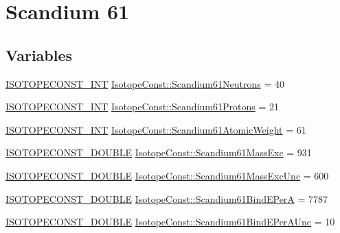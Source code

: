 \hypertarget{group___isotope_const-_scandium-_sc61}{}\section{Scandium 61}
\label{group___isotope_const-_scandium-_sc61}
\subsection*{Variables}
\begin{DoxyCompactItemize}
\item 
\mbox{\hyperlink{group___isotope_const-_macros_ga5f18360b3e99483a35c32d789e62621c}{I\+S\+O\+T\+O\+P\+E\+C\+O\+N\+S\+T\+\_\+\+I\+NT}} \mbox{\hyperlink{group___isotope_const-_scandium-_sc61_ga72674bbcf1a0c69a33a05f1c0ea682df}{Isotope\+Const\+::\+Scandium61\+Neutrons}} = 40
\item 
\mbox{\hyperlink{group___isotope_const-_macros_ga5f18360b3e99483a35c32d789e62621c}{I\+S\+O\+T\+O\+P\+E\+C\+O\+N\+S\+T\+\_\+\+I\+NT}} \mbox{\hyperlink{group___isotope_const-_scandium-_sc61_ga0e2af0cd8f75fbd1a98f882e19ab2bc1}{Isotope\+Const\+::\+Scandium61\+Protons}} = 21
\item 
\mbox{\hyperlink{group___isotope_const-_macros_ga5f18360b3e99483a35c32d789e62621c}{I\+S\+O\+T\+O\+P\+E\+C\+O\+N\+S\+T\+\_\+\+I\+NT}} \mbox{\hyperlink{group___isotope_const-_scandium-_sc61_ga2cedbe59fbbc5c5a9eeccf7d03f5f83b}{Isotope\+Const\+::\+Scandium61\+Atomic\+Weight}} = 61
\item 
\mbox{\hyperlink{group___isotope_const-_macros_ga8f45a7272ce02c0b4c65c44636ed719a}{I\+S\+O\+T\+O\+P\+E\+C\+O\+N\+S\+T\+\_\+\+D\+O\+U\+B\+LE}} \mbox{\hyperlink{group___isotope_const-_scandium-_sc61_gabae15a655a417d2402a985e17d57590c}{Isotope\+Const\+::\+Scandium61\+Mass\+Exc}} = 931
\item 
\mbox{\hyperlink{group___isotope_const-_macros_ga8f45a7272ce02c0b4c65c44636ed719a}{I\+S\+O\+T\+O\+P\+E\+C\+O\+N\+S\+T\+\_\+\+D\+O\+U\+B\+LE}} \mbox{\hyperlink{group___isotope_const-_scandium-_sc61_ga46a14abac26ddc05532071ecec5428f4}{Isotope\+Const\+::\+Scandium61\+Mass\+Exc\+Unc}} = 600
\item 
\mbox{\hyperlink{group___isotope_const-_macros_ga8f45a7272ce02c0b4c65c44636ed719a}{I\+S\+O\+T\+O\+P\+E\+C\+O\+N\+S\+T\+\_\+\+D\+O\+U\+B\+LE}} \mbox{\hyperlink{group___isotope_const-_scandium-_sc61_ga5f6ff690716f01feb1552534ef5199cb}{Isotope\+Const\+::\+Scandium61\+Bind\+E\+PerA}} = 7787
\item 
\mbox{\hyperlink{group___isotope_const-_macros_ga8f45a7272ce02c0b4c65c44636ed719a}{I\+S\+O\+T\+O\+P\+E\+C\+O\+N\+S\+T\+\_\+\+D\+O\+U\+B\+LE}} \mbox{\hyperlink{group___isotope_const-_scandium-_sc61_ga506a6c52d6e279289a5661b6ee5e7c3a}{Isotope\+Const\+::\+Scandium61\+Bind\+E\+Per\+A\+Unc}} = 10

\end{DoxyCompactItemize}
